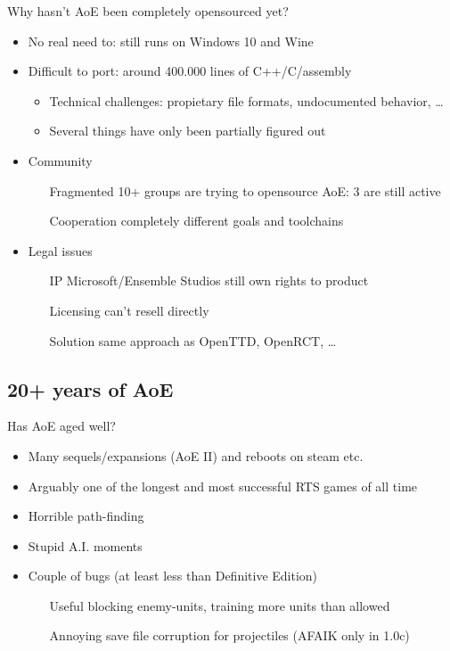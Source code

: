\documentclass{beamer}
\begin{document}
\begin{frame}{Why hasn't AoE been completely opensourced yet?}
	\begin{itemize}
		\item No real need to: still runs on Windows 10 and Wine
		\item Difficult to port: around 400.000 lines of C++/C/assembly
		\begin{itemize}
			\item Technical challenges: propietary file formats, undocumented behavior, \dots
			\item Several things have only been partially figured out
		\end{itemize}
		\item Community
		\begin{itemize}
			\item[Fragmented] 10+ groups are trying to opensource AoE: 3 are still active
			\item[Cooperation] completely different goals and toolchains
		\end{itemize}
		\item Legal issues
		\begin{itemize}
			\item[IP] Microsoft/Ensemble Studios still own rights to product
			\item[Licensing] can't resell directly
			\item[Solution] same approach as OpenTTD, OpenRCT, \dots
		\end{itemize}
	\end{itemize}

\end{frame}


\subsection{20+ years of AoE}

\begin{frame}{Has AoE aged well?}
	\begin{itemize}
		\item Many sequels/expansions (AoE II) and reboots on steam etc.
		\item Arguably one of the longest and most successful RTS games of all time
		\item Horrible path-finding
		\item Stupid A.I. moments
		\item Couple of bugs (at least less than Definitive Edition)
		\begin{itemize}
			\item[Useful] blocking enemy-units, training more units than allowed
			\item[Annoying] save file corruption for projectiles (AFAIK only in 1.0c)
		\end{itemize}
	\end{itemize}

\end{frame}
\end{document}
